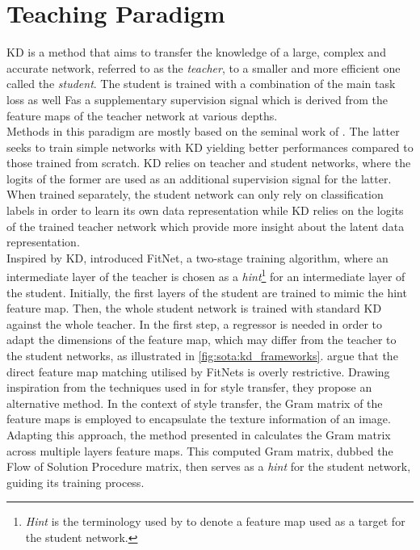 \section{Teaching Paradigm}\label{sec:sota:teaching_paradigm}


\acf{KD} is a method that aims to transfer the knowledge of a large, complex and
accurate network, referred to as the \emph{teacher}, to a smaller and more
efficient one called the \emph{student}. The student is trained with a
combination of the main task loss as well Fas a supplementary supervision signal
which is derived from the feature maps of the teacher network at various
depths.\\

Methods in this paradigm are mostly based on the seminal work of
\citeauthor{DBLP:journals/corr/HintonVD15} \cite{DBLP:journals/corr/HintonVD15}.
The latter seeks to train simple networks with \acl{KD} yielding better
performances compared to those trained from scratch. \ac{KD} relies on teacher
and student networks, where the logits of the former are used as an additional
supervision signal for the latter. When trained separately, the student network
can only rely on classification labels in order to learn its own data
representation while \ac{KD} relies on the logits of the trained teacher network which
provide more insight about the latent data representation.\\

Inspired by \ac{KD}, \cite{DBLP:journals/corr/RomeroBKCGB14} introduced FitNet,
a two-stage training algorithm, where an intermediate layer of the teacher is
chosen as a \emph{hint}\footnote{\emph{Hint} is the terminology used by
\citeauthor{DBLP:journals/corr/RomeroBKCGB14}
\cite{DBLP:journals/corr/RomeroBKCGB14} to denote a feature map used as a target
for the student network.} for an intermediate layer of the student. Initially,
the first layers of the student are trained to mimic the hint feature map. Then,
the whole student network is trained with standard \ac{KD} against the whole
teacher. In the first step, a regressor is needed in order to adapt the
dimensions of the feature map, which may differ from the teacher to the student
networks, as illustrated in \cref{fig:sota:kd_frameworks}.
\citeauthor{DBLP:conf/cvpr/YimJBK17} argue that the direct feature map matching
utilised by FitNets is overly restrictive. Drawing inspiration from the
techniques used in \cite{DBLP:journals/corr/GatysEB15a} for style transfer, they
propose an alternative method. In the context of style transfer, the Gram matrix
of the feature maps is employed to encapsulate the texture information of an
image. Adapting this approach, the method presented in
\cite{DBLP:conf/cvpr/YimJBK17} calculates the Gram matrix across multiple layers
feature maps. This computed Gram matrix, dubbed the Flow of Solution Procedure
matrix, then serves as a \emph{hint} for the student network, guiding its
training process.\\

